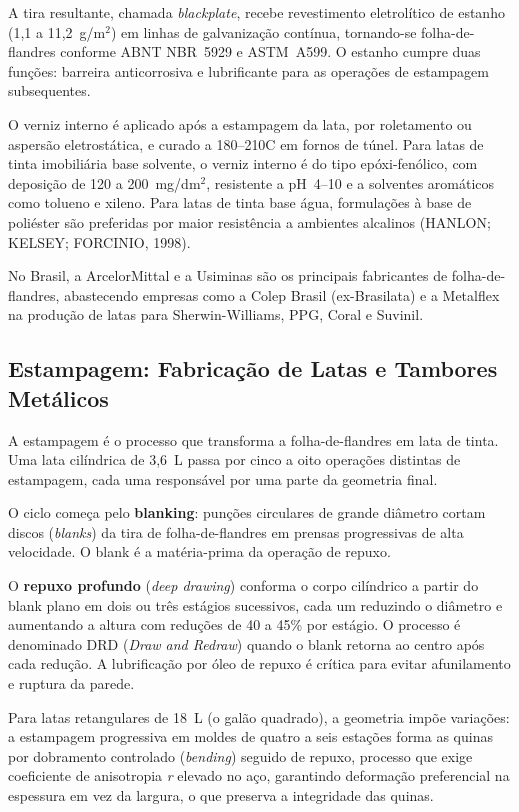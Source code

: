 \documentclass[
  12pt,
  a4paper,
  oneside,
  brazil,
  chapter=TITLE
]{article}
\begin{document}
A tira resultante, chamada \textit{blackplate}, recebe revestimento eletrolítico
de estanho (1,1 a 11,2~g/m$^2$) em linhas de galvanização contínua, tornando-se
folha-de-flandres conforme ABNT NBR~5929 e ASTM~A599. O estanho cumpre duas
funções: barreira anticorrosiva e lubrificante para as operações de estampagem
subsequentes.

O verniz interno é aplicado após a estampagem da lata, por roletamento ou
aspersão eletrostática, e curado a 180--210\textdegree{}C em fornos de túnel. Para latas de
tinta imobiliária base solvente, o verniz interno é do tipo epóxi-fenólico, com
deposição de 120 a 200~mg/dm$^2$, resistente a pH~4--10 e a solventes aromáticos
como tolueno e xileno. Para latas de tinta base água, formulações à base de
poliéster são preferidas por maior resistência a ambientes alcalinos (HANLON;
KELSEY; FORCINIO, 1998).

No Brasil, a ArcelorMittal e a Usiminas são os principais fabricantes de
folha-de-flandres, abastecendo empresas como a Colep Brasil (ex-Brasilata) e a
Metalflex na produção de latas para Sherwin-Williams, PPG, Coral e Suvinil.

\subsection{Estampagem: Fabricação de Latas e Tambores Metálicos}\label{estampagem}

A estampagem é o processo que transforma a folha-de-flandres em lata de tinta.
Uma lata cilíndrica de 3,6~L passa por cinco a oito operações distintas de
estampagem, cada uma responsável por uma parte da geometria final.

O ciclo começa pelo \textbf{blanking}: punções circulares de grande diâmetro
cortam discos (\textit{blanks}) da tira de folha-de-flandres em prensas
progressivas de alta velocidade. O blank é a matéria-prima da operação de repuxo.

O \textbf{repuxo profundo} (\textit{deep drawing}) conforma o corpo cilíndrico a
partir do blank plano em dois ou três estágios sucessivos, cada um reduzindo o
diâmetro e aumentando a altura com reduções de 40 a 45\% por estágio. O processo
é denominado DRD (\textit{Draw and Redraw}) quando o blank retorna ao centro após
cada redução. A lubrificação por óleo de repuxo é crítica para evitar
afunilamento e ruptura da parede.

Para latas retangulares de 18~L (o galão quadrado), a geometria impõe variações:
a estampagem progressiva em moldes de quatro a seis estações forma as quinas por
dobramento controlado (\textit{bending}) seguido de repuxo, processo que exige
coeficiente de anisotropia \textit{r} elevado no aço, garantindo deformação
preferencial na espessura em vez da largura, o que preserva a integridade das
quinas.
\end{document}
